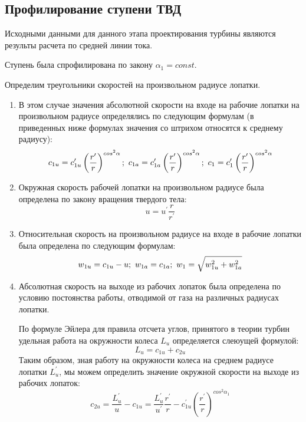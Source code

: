 \subsection{Профилирование ступени ТВД}
Исходными данными для данного этапа проектирования турбины являются результы расчета по средней линии тока.

Ступень была спрофилирована по закону $\alpha_1=const$.

Определим треугольники скоростей на произвольном радиусе лопатки.

\begin{enumerate}

	\item В этом случае значения абсолютной скорости на входе на рабочие лопатки на произвольном радиусе определялись по следующим формулам (в приведенных ниже формулах значения со штрихом относятся к среднему радиусу):
		$$
			c_{1u} = c_{1u}^\prime \left( \frac{r^\prime}{r} \right)^{cos^2\alpha}; \/\
			c_{1a} = c_{1a}^\prime \left( \frac{r^\prime}{r} \right)^{cos^2\alpha}; \/\
			c_1 = c_1^\prime \left( \frac{r^\prime}{r} \right)^{cos^2\alpha}
		$$

	\item Окружная скорость рабочей лопатки на произвольном радиусе была определена по закону вращения твердого тела:
		$$
			u = u^\prime \frac{r}{r^\prime}
		$$

	\item Относительная скорость на произвольном радиусе на входе в рабочие лопатки была определена по следующим формулам:
		$$
			w_{1u} = c_{1u} - u; \/\ 
			w_{1a} = c_{1a}; \/\ 
			w_1 = \sqrt{w_{1u}^2 + w_{1a}^2}
		$$

	\item Абсолютная скорость на выходе из рабочих лопаток была определена по условию постоянства работы, отводимой от газа на различных радиусах лопатки.

	По формуле Эйлера для правила отсчета углов, принятого в теории турбин удельная работа на окружности колеса $L_u$ определяется слеюущей формулой:
		$$
			L_u = c_{1u} + c_{2u}
		$$
	Таким образом, зная работу на окружности колеса на среднем радиусе лопатки $L_u^\prime$, мы можем определить значение окружной скорости на выходе из рабочих лопаток:
		$$
			c_{2u} = \frac{L_u^\prime}{u} - c_{1u} =
				\frac{L_u^\prime}{u^\prime} 
				\frac{r^\prime}{r} - 
				c_{1u}^\prime \left( 
					\frac{r^\prime}{r} 
				\right)^{cos^2\alpha_1} 
		$$


\end{enumerate}
